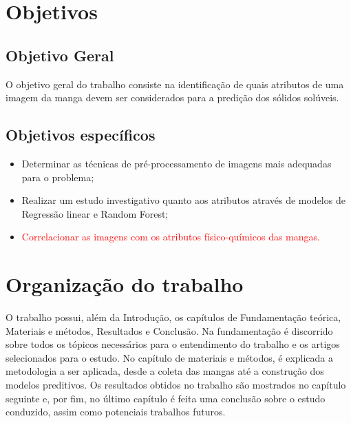 \section{Objetivos}

\subsection{Objetivo Geral}
O objetivo geral do trabalho consiste na identificação de quais atributos de uma imagem da manga devem ser considerados para a predição dos sólidos solúveis. 

\subsection{Objetivos específicos}

\begin{itemize}
	\item Determinar as técnicas de pré-processamento de imagens mais adequadas para o problema;
    \item Realizar um estudo investigativo quanto aos atributos através de modelos de Regressão linear e Random Forest;
    \item \textcolor{red}{Correlacionar as imagens com os atributos físico-químicos das mangas.}
\end{itemize}

\section{Organização do trabalho}

O trabalho possui, além da Introdução, os capítulos de Fundamentação teórica, Materiais e métodos, Resultados e Conclusão. Na fundamentação é discorrido sobre todos os tópicos necessários para o entendimento do trabalho e os artigos selecionados para o estudo. No capítulo de materiais e métodos, é explicada a metodologia a ser aplicada, desde a coleta das mangas até a construção dos modelos preditivos. Os resultados obtidos no trabalho são mostrados no capítulo seguinte e, por fim, no último capítulo é feita uma conclusão sobre o estudo conduzido, assim como potenciais trabalhos futuros.
